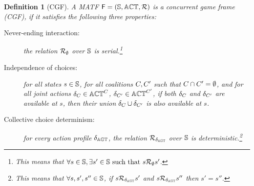 \documentclass{article}
\newtheorem{definition}{Definition}
\begin{document}

\begin{definition}[CGF]\label{def: CGF}
  A MATF $\mathsf{F}  = (\mathbb{S}, \mathbb{ACT}, \mathcal{R})$ is a concurrent game frame (CGF), if  it satisfies the following three properties:
  \begin{description}
    \item[Never-ending interaction:] 
    the relation $\mathcal{R}_{\emptyset}$
    over $\mathbb{S}$ is serial.\footnote{This means
    that $\forall s\in \mathbb{S}, \exists s'\in \mathbb{S} \text{ such that }s\mathcal{R}_{\emptyset} s' $. }
    \item[Independence of choices:] for all states $s \in \mathbb{S}$, for all coalitions $C, C'$ such that $C \cap C' = \emptyset$, and for all joint actions $\delta_{C} \in \mathbb{ACT}^{C}$, $\delta_{C'} \in \mathbb{ACT}^{C'}$, if both $\delta_{C}$ and $\delta_{C'}$ are available at $s$, then their union $\delta_{C} \cup \delta_{C'}$ is also available at $s$.

    \item[Collective choice determinism:] for every  action profile $\delta_{\mathbb{AGT}}$,
     the relation $\mathcal{R}_{\delta_{\mathbb{AGT}}}$
    over $\mathbb{S}$ is deterministic.\footnote{This means
    that $\forall s,s',s''\in \mathbb{S}$, if $s\mathcal{R}_{\delta_{\mathbb{AGT}}} s' $
and $s\mathcal{R}_{\delta_{\mathbb{AGT}}} s'' $ then $s'=s''$. }
  \end{description}
\end{definition}
\end{document}
